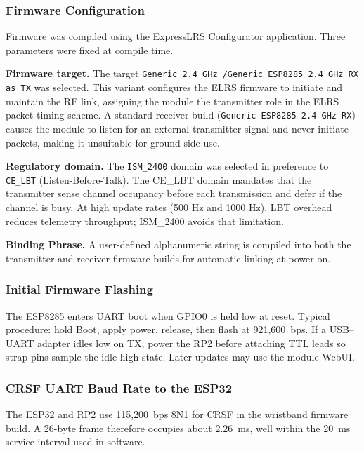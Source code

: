 \subsubsection{Firmware Configuration}
\label{subsubsec:fw-config}

Firmware was compiled using the ExpressLRS Configurator application.
Three parameters were fixed at compile time.

\textbf{Firmware target.}
The target
\texttt{Generic 2.4\,GHz /\allowbreak Generic ESP8285 2.4\,GHz RX as TX} was selected.
This variant configures the ELRS firmware to initiate and maintain the RF link, assigning the
module the transmitter role in the ELRS packet timing scheme.
A standard receiver build (\texttt{Generic ESP8285 2.4\,GHz RX}) causes the module to listen
for an external transmitter signal and never initiate packets, making it unsuitable for ground-side
use.

\textbf{Regulatory domain.}
The \texttt{ISM\_2400} domain was selected in preference to \texttt{CE\_LBT}
(Listen-Before-Talk).
The CE\_LBT domain mandates that the transmitter sense channel occupancy before each
transmission and defer if the channel is busy.
At high update rates (500 Hz and 1000 Hz), LBT overhead reduces telemetry throughput; ISM\_2400
avoids that limitation.

\textbf{Binding Phrase.}
A user-defined alphanumeric string is compiled into both the transmitter and receiver firmware
builds for automatic linking at power-on.

\subsubsection{Initial Firmware Flashing}
\label{subsubsec:flashing}

The ESP8285 enters UART boot when GPIO0 is held low at reset.
Typical procedure: hold Boot, apply power, release, then flash at 921,600~bps.
If a USB--UART adapter idles low on TX, power the RP2 before attaching TTL leads so strap pins
sample the idle-high state.
Later updates may use the module WebUI.

\subsubsection{CRSF UART Baud Rate to the ESP32}
\label{subsubsec:crsf}

The ESP32 and RP2 use 115,200~bps 8N1 for CRSF in the wristband firmware build.
A 26-byte frame therefore occupies about 2.26~ms, well within the 20~ms service interval used in
software.

